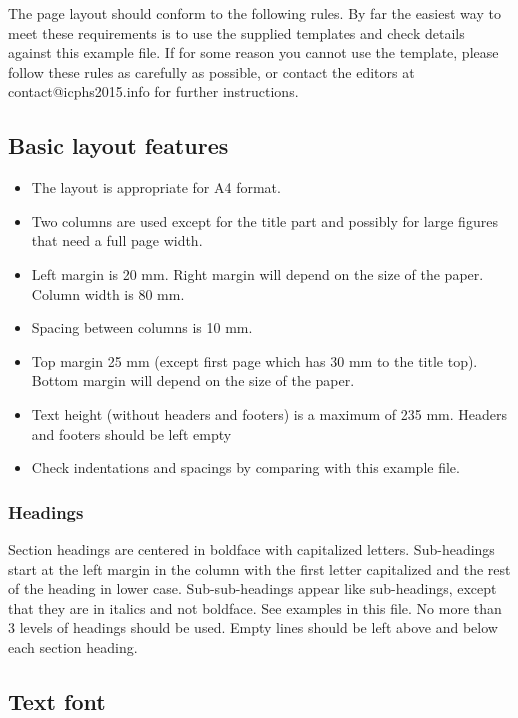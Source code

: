 \documentclass[a4paper,11pt,twocolumn]{article}
\begin{document}
The page layout should conform to the following rules. By far the easiest way to meet these requirements is to use the supplied templates and check details against this example file. If for some reason you cannot use the template, please follow these rules as carefully as possible, or contact the editors at contact@icphs2015.info for further instructions.

\subsection{Basic layout features}

\begin{itemize}
\item The layout is appropriate for A4 format.
\item Two columns are used
  except for the title part and possibly for large figures that need a
  full page width.
\item Left margin is 20 mm. Right margin will depend on
  the size of the paper. Column width is 80 mm.
\item Spacing between
  columns is 10 mm.
\item Top margin 25 mm (except first page which has 30
  mm to the title top). Bottom margin will depend on the size of the
  paper.
\item Text height (without headers and footers) is a maximum of
  235 mm.  Headers and footers should be left empty
\item Check indentations
  and spacings by comparing with this example file.
\end{itemize}

\subsubsection{Headings}

Section headings are centered in boldface with capitalized letters. Sub-headings start at the left margin in the column with the first letter capitalized and the rest of the heading in lower case. Sub-sub-headings appear like sub-headings, except that they are in italics and not boldface. See examples in this file. No more than 3 levels of headings should be used.  Empty lines should be left above and below each section heading.

\subsection{Text font}
\end{document}
